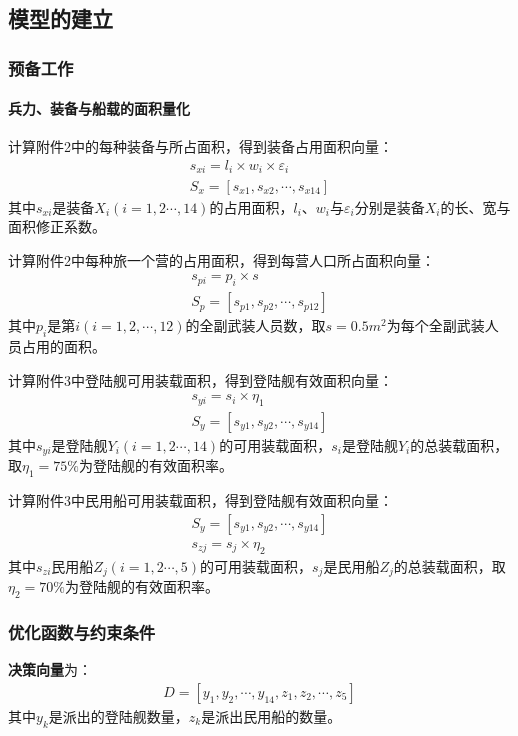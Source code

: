 \documentclass{whutmod}
\begin{document}
	    \subsection{模型的建立}
	    \subsubsection{预备工作}
	    \paragraph{兵力、装备与船载的面积量化}
	    计算附件2中的每种装备与所占面积，得到装备占用面积向量：
	    \begin{gather}
	    s_{xi}=l_{i}\times w_{i} \times \varepsilon _{i}\\
	        S_{x}=[s_{x1},s_{x2},\cdots,s_{x14}]
	    \end{gather}
	    其中$s_{xi}$是装备$X_{i}(i=1,2\cdots,14)$的占用面积，$l_{i}$、$w_{i}$与$\varepsilon _{i}$分别是装备$X_{i}$的长、宽与面积修正系数。
	    
	     计算附件2中每种旅一个营的占用面积，得到每营人口所占面积向量：
	     \begin{gather}
	     s_{pi}=p_{i}\times s\\
	     S_{p}=[s_{p1},s_{p2},\cdots,s_{p12}]
	     \end{gather}
	     其中$p_{i}$是第$i(i=1,2,\cdots,12)$的全副武装人员数，取$s=0.5m^2$为每个全副武装人员占用的面积。
	     
	     计算附件3中登陆舰可用装载面积，得到登陆舰有效面积向量：
	      \begin{gather}
	      s_{yi}=s_{i}\times \eta_{1}\\
	      S_{y}=[s_{y1},s_{y2},\cdots,s_{y14}]
	      \end{gather}
	    其中$s_{yi}$是登陆舰$Y_{i}(i=1,2\cdots,14)$的可用装载面积，$s_{i}$是登陆舰$Y_{i}$的总装载面积，取$\eta_{1}=75\%$为登陆舰的有效面积率。
	    
	    计算附件3中民用船可用装载面积，得到登陆舰有效面积向量：
	      \begin{gather}
	     S_{y}=[s_{y1},s_{y2},\cdots,s_{y14}]\\
	      s_{zj}=s_{j}\times \eta_{2}
	      \end{gather}
	       其中$s_{zi}$民用船$Z_{j}(i=1,2\cdots,5)$的可用装载面积，$s_{j}$是民用船$Z_{j}$的总装载面积，取$\eta_{2}=70\%$为登陆舰的有效面积率。
	    \subsubsection{优化函数与约束条件}
	    \textbf{决策向量}为：
	     \begin{gather}
	     D=[y_{1},y_{2},\cdots,y_{14},z_{1},z_{2},\cdots,z_{5}]
	    \end{gather}
	    其中$y_{k}$是派出的登陆舰数量，$z_{k}$是派出民用船的数量。
	    
\end{document}

